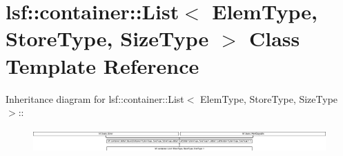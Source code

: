 \hypertarget{classlsf_1_1container_1_1List}{
\section{lsf::container::List$<$ ElemType, StoreType, SizeType $>$ Class Template Reference}
\label{classlsf_1_1container_1_1List}
}
Inheritance diagram for lsf::container::List$<$ ElemType, StoreType, SizeType $>$::\begin{figure}[H]
\begin{center}
\leavevmode
\includegraphics[height=0.930233cm]{classlsf_1_1container_1_1List}
\end{center}
\end{figure}
